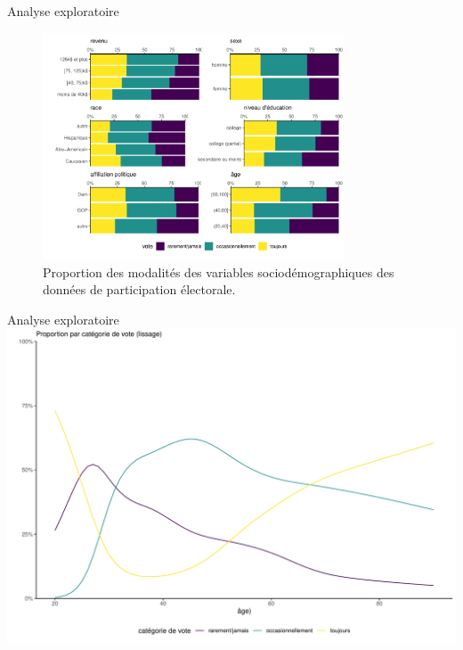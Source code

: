 \documentclass[
  ignorenonframetext,
]{beamer}
\begin{document}
\begin{frame}{Analyse exploratoire}
\protect\hypertarget{analyse-exploratoire}{}
\begin{figure}

{\centering \includegraphics[width=0.8\textwidth,height=\textheight]{MATH60602-diapos7_files/figure-beamer/fig-multinom_means-Ipsos-1.pdf}

}

\caption{\label{fig-multinom_means-Ipsos}Proportion des modalités des
variables sociodémographiques des données de participation électorale.}

\end{figure}
\end{frame}

\begin{frame}{Analyse exploratoire}
\protect\hypertarget{analyse-exploratoire-1}{}
\includegraphics{MATH60602-diapos7_files/figure-beamer/figure-age-1.pdf}
\end{frame}
\end{document}
